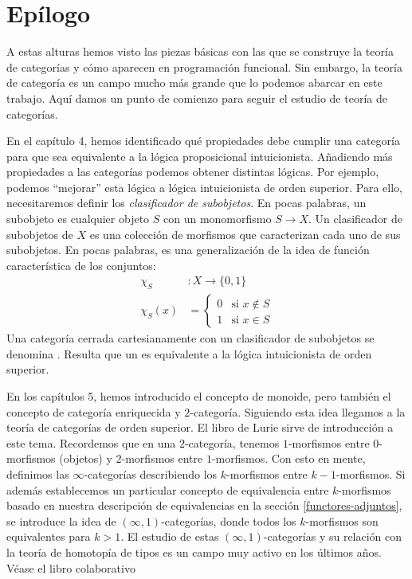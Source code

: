 \chapter*{Epílogo}

A estas alturas hemos visto las piezas básicas con las que se construye la teoría de categorías y cómo aparecen en programación funcional.
Sin embargo, la teoría de categoría es un campo mucho más grande que lo podemos abarcar en este trabajo.
Aquí damos un punto de comienzo para seguir el estudio de teoría de categorías.

En el capítulo 4, hemos identificado qué propiedades debe cumplir una categoría para que sea equivalente a la lógica proposicional intuicionista.
Añadiendo más propiedades a las categorías podemos obtener distintas lógicas.
Por ejemplo, podemos ``mejorar'' esta lógica a lógica intuicionista de orden superior.
Para ello, necesitaremos definir los \emph{clasificador de subobjetos}.
En pocas palabras, un subobjeto es cualquier objeto $S$ con un monomorfismo $S \to X$.
Un clasificador de subobjetos de $X$ es una colección de morfismos que caracterizan cada uno de sus subobjetos.
En pocas palabras, es una generalización de la idea de función característica de los conjuntos:
\begin{align*}
\chi_S & \colon X \to \{0,1\}\\
\chi_S (x) & = \begin{cases}0 & \text{si }x \notin S\\1 & \text{si }x \in S\end{cases}
\end{align*}
Una categoría cerrada cartesianamente con un clasificador de subobjetos se denomina .
Resulta que un  es equivalente a la lógica intuicionista de orden superior.

En los capítulos 5, hemos introducido el concepto de monoide, pero también el concepto de categoría enriquecida y $2$-categoría.
Siguiendo esta idea llegamos a la teoría de categorías de orden superior. El libro de Lurie sirve de introducción a este tema.
Recordemos que en una $2$-categoría, tenemos $1$-morfismos entre $0$-morfismos (objetos) y $2$-morfismos entre $1$-morfismos.
Con esto en mente, definimos las $\infty$-categorías describiendo los $k$-morfismos entre $k-1$-morfismos.
Si además establecemos un particular concepto de equivalencia entre $k$-morfismos basado en nuestra descripción de equivalencias en la sección \ref{functores-adjuntos}, se introduce la idea de $(\infty,1)$-categorías, donde todos los $k$-morfismos son equivalentes para $k > 1$.
El estudio de estas $(\infty,1)$-categorías y su relación con la teoría de homotopía de tipos es un campo muy activo en los últimos años.
Véase el libro colaborativo 
